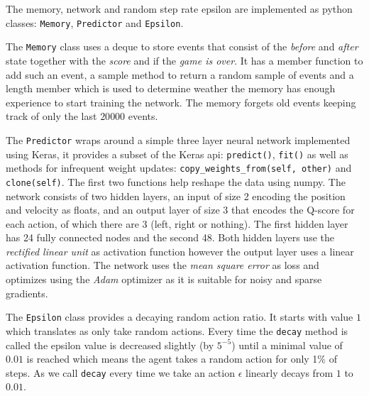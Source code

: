 The memory, network and random step rate epsilon are implemented as python classes: \texttt{Memory}, \texttt{Predictor} and \texttt{Epsilon}. 

The \texttt{Memory} class uses a deque to store events that consist of the \textit{before} and \textit{after} state together with the \textit{score} and if the \textit{game is over}. It has a member function to add such an event, a sample method to return a random sample of events and a length member which is used to determine weather the memory has enough experience to start training the network. The memory forgets old events keeping track of only the last $20 000$ events.

The \texttt{Predictor} wraps around a simple three layer neural network implemented using Keras\cite{keras}, it provides a subset of the Keras api: \texttt{predict()}, \texttt{fit()} as well as methods for infrequent weight updates: \texttt{copy\_weights\_from(self, other)} and \texttt{clone(self)}. The first two functions help reshape the data using numpy\cite{numpy}. The network consists of two hidden layers, an input of size 2 encoding the position and velocity as floats, and an output layer of size 3 that encodes the Q-score for each action, of which there are 3 (left, right or nothing).
The first hidden layer has 24 fully connected nodes and the second 48. Both hidden layers use the \textit{rectified linear unit} as activation function however the output layer uses a linear activation function. The network uses the \textit{mean square error} as loss and optimizes using the \textit{Adam} optimizer as it is suitable for noisy and sparse gradients.

The \texttt{Epsilon} class provides a decaying random action ratio. It starts with value $1$ which translates as only take random actions. Every time the \texttt{decay} method is called the epsilon value is decreased slightly (by $5^{-5}$) until a minimal value of $0.01$ is reached which means the agent takes a random action for only 1\% of steps. As we call \texttt{decay} every time we take an action $\epsilon$ linearly decays from $1$ to $0.01$.

